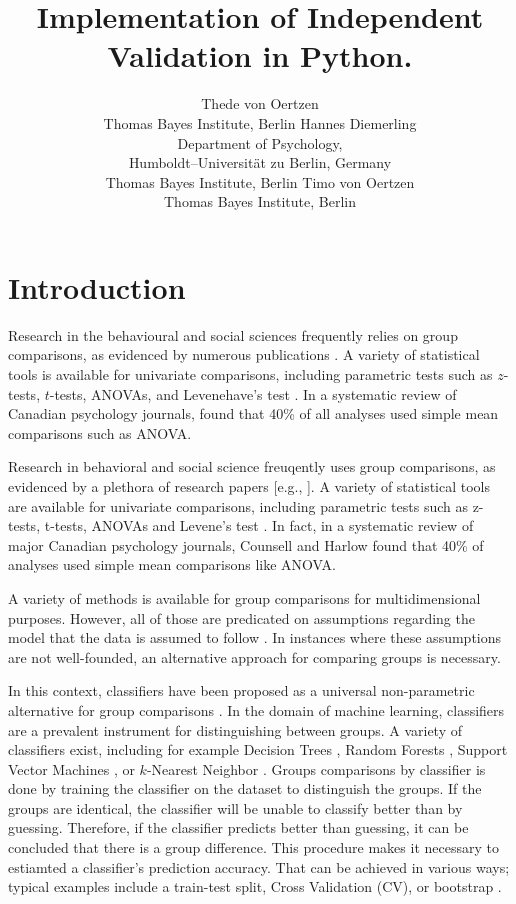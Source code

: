 \documentclass[man]{apa7}
\author{Thede von Oertzen\\Thomas Bayes Institute, Berlin
   \And Hannes Diemerling\\Department of Psychology,\\Humboldt–Universität zu Berlin, Germany\\Thomas Bayes Institute, Berlin
   \And Timo von Oertzen\\Thomas Bayes Institute, Berlin
}
\title{Implementation of Independent Validation in Python.}
\begin{document}
\section{Introduction} \label{sec:intro}

Research in the behavioural and social sciences frequently relies on group comparisons, as evidenced by numerous publications \citep[e.g.,][]{wee_comparison_2000, weisberg_gender_2011, zhao_comparison_2020}.  A variety of statistical tools is available for univariate comparisons, including parametric tests such as $z$-tests, $t$-tests, ANOVAs, and Levenehave’s test \citep{pearson1900x, student1908probable, fisher1970statistical, levene1960robust}.  In a systematic review of Canadian psychology journals, \citet{counsell_reporting_2017} found that 40\% of all analyses used simple mean comparisons such as ANOVA.

Research in behavioral and social science freuqently uses group comparisons, as evidenced by a plethora of research papers [e.g., \citep{wee_comparison_2000, weisberg_gender_2011, zhao_comparison_2020}].
A variety of statistical tools are available for univariate comparisons, including parametric tests such as z-tests, t-tests, ANOVAs and Levene's test \citep{pearson1900x, student1908probable, fisher1970statistical, levene1960robust}.
In fact, in a systematic review of major Canadian psychology journals, Counsell and Harlow \citep{counsell_reporting_2017} found that 40\% of analyses used simple mean comparisons like ANOVA.

A variety of methods is available for group comparisons for multidimensional purposes.
However, all of those are predicated on assumptions regarding the model that the data is assumed to follow \citep{kim_classifiers_2018}.
In instances where these assumptions are not well-founded, an alternative approach for comparing groups is necessary.

In this context, classifiers \citep{boucheron_theory_2005, bay_detecting_2001} have been proposed as a universal non-parametric alternative for group comparisons \citep{kim_classifiers_2018}.
In the domain of machine learning, classifiers are a prevalent instrument for distinguishing between groups.
A variety of classifiers exist, including for example Decision Trees \citep{breiman_classification_2017}, Random Forests \citep{ho_random_1995}, Support Vector Machines \citep{cortes_support-vector_1995}, or $k$-Nearest Neighbor \citep{cover_nearest_1967}.
Groups comparisons by classifier is done by training the classifier on the dataset to distinguish the groups.
If the groups are identical, the classifier will be unable to classify better than by guessing.
Therefore, if the classifier predicts better than guessing, it can be concluded that there is a group difference.
This procedure makes it necessary to estiamted a classifier's prediction accuracy.
That can be achieved in various ways; typical examples include a train-test split, Cross Validation (CV), or bootstrap \citep{kohavi_study_1995}.
\end{document}
